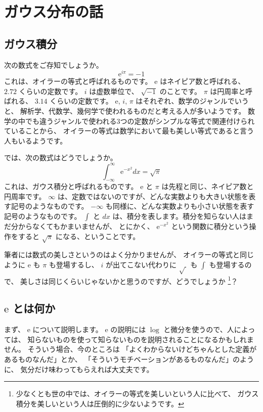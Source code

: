 \documentclass[uplatex,dvipdfmx]{jsarticle}
\begin{document}
\tableofcontents

\section{ガウス分布の話}
\subsection{ガウス積分}
  次の数式をご存知でしょうか。
  \begin{equation}
    \label{gaussian-integral}
    \mathrm{e}^{i\pi} = -1
  \end{equation}
  これは、オイラーの等式と呼ばれるものです。
  $\mathrm{e}$ はネイピア数と呼ばれる、 $2.72$ くらいの定数です。
  $i$ は虚数単位で、 $\sqrt{-1}$ のことです。
  $\pi$ は円周率と呼ばれる、 $3.14$ くらいの定数です。
  $\mathrm{e}$, $i$, $\pi$ はそれぞれ、数学のジャンルでいうと、
  解析学、代数学、幾何学で使われるものだと考える人が多いようです。
  数学の中でも違うジャンルで使われる3つの定数がシンプルな等式で関連付けられていることから、
  オイラーの等式は数学において最も美しい等式であると言う人もいるようです。

  では、次の数式はどうでしょうか。
  \[
    \int_{-\infty}^{\infty}\mathrm{e}^{-x^2}dx = \sqrt{\pi}
  \]
  これは、ガウス積分と呼ばれるものです。
  $\mathrm{e}$ と $\pi$ は先程と同じ、ネイピア数と円周率です。
  $\infty$ は、定数ではないのですが、どんな実数よりも大きい状態を表す記号のようなものです。
  $-\infty$ も同様に、どんな実数よりも小さい状態を表す記号のようなものです。
  $\int$ と $dx$ は、積分を表します。積分を知らない人はまだ分からなくてもかまいませんが、
  とにかく、 $\mathrm{e}^{-x^2}$ という関数に積分という操作をすると $\sqrt{\pi}$ になる、ということです。

  筆者には数式の美しさというのはよく分かりませんが、
  オイラーの等式と同じように $\mathrm{e}$ も $\pi$ も登場するし、
  $i$ が出てこない代わりに $\sqrt{~}$ も $\int$ も登場するので、
  美しさは同じくらいじゃないかと思うのですが、どうでしょうか
  \footnote{
    少なくとも世の中では、オイラーの等式を美しいという人に比べて、
    ガウス積分を美しいという人は圧倒的に少ないようです。
  }？

\subsection{$\mathrm{e}$ とは何か}
  まず、 $\mathrm{e}$ について説明します。
  $\mathrm{e}$ の説明には $\log$ と微分を使うので、人によっては、
  知らないものを使って知らないものを説明されることになるかもしれません。
  そういう場合、今のところは
  「よくわからないけどちゃんとした定義があるものなんだ」とか、
  「そういうモチベーションがあるものなんだ」のように、
  気分だけ味わってもらえれば大丈夫です。
  
\end{document}
